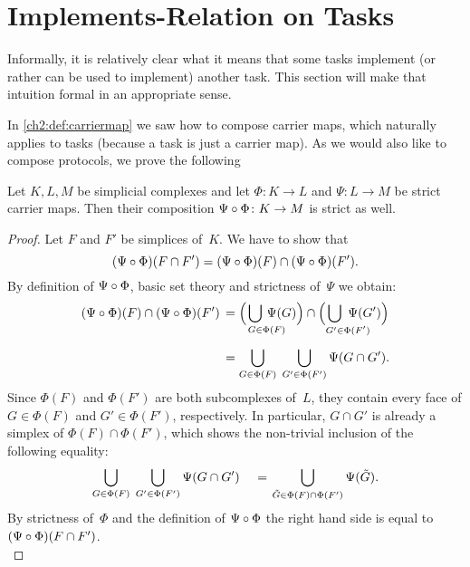 \section{Implements-Relation on Tasks}
Informally, it is relatively clear what it means that some tasks implement
(or rather can be used to implement) another task. This section will make
that intuition formal in an appropriate sense.

In \cref{ch2:def:carriermap} we saw how to compose carrier maps,
which naturally applies to tasks (because a task is just a carrier
map). As we would also like to compose protocols, we prove the following

\begin{thLemma}
    \label{ch2:strictcompos}
    Let $K,L,M$ be simplicial complexes and let $\Phi\colon K\to L$
    and $\Psi\colon L\to M$ be strict carrier maps.
    Then their composition $\Psi\after\Phi\colon K\to M$ is strict as well.
\end{thLemma}

\begin{proof}
    Let $F$ and $F'$ be simplices of~$K$. We have to show that
    \[ (\Psi\after\Phi)(F\cap F')
        = (\Psi\after\Phi)(F) \cap (\Psi\after\Phi)(F')
    . \]
    By definition of $\Psi\after\Phi$, basic set theory and strictness
    of~$\Psi$ we obtain:
    \begin{align*}
    (\Psi\after\Phi)(F) \cap (\Psi\after\Phi)(F')
        \,&=
        \Bigl( \mkern2mu \bigcup_{G\in\mathrlap{\Phi(F)}} \, \Psi(G) \Bigr)
            \cap \Bigl( \bigcup_{G'\in\mathrlap{\Phi(F')}} \, \Psi(G') \Bigr)
            \\[5pt]
        &=
        \bigcup_{G\in\Phi(F)} \; \bigcup_{G'\in\Phi(F')}
            \Psi(G\cap G')
    . \end{align*}
    Since $\Phi(F)$ and $\Phi(F')$ are both subcomplexes of~$L$, they contain every
    face of $G\in\Phi(F)$ and $G'\in\Phi(F')$, respectively. In particular,
    $G\cap G'$ is already a simplex of $\Phi(F)\cap\Phi(F')$, which shows the
    non-trivial inclusion of the following equality:
\pagebreak[2]
    \[ \bigcup_{G\in\Phi(F)} \; \bigcup_{G'\in\Phi(F')} \Psi(G\cap G')
        \quad\mkern2mu=\mkern2mu
        \bigcup_{\tilde G\in\Phi(F)\cap \Phi(F')} \Psi(\tilde G)
    . \]
    By strictness of~$\Phi$ and the definition of $\Psi\after\Phi$ the right
    hand side is equal to $(\Psi\after\Phi)(F\cap F')$.
    \\
\end{proof}

